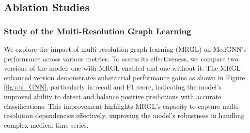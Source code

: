 \vspace{-2mm}
\subsection{Ablation Studies}



\subsubsection{Study of the Multi-Resolution Graph Learning}
We explore the impact of multi-resolution graph learning (MRGL) on MedGNN's performance across various metrics. To assess its effectiveness, we compare two versions of the model: one with MRGL enabled and one without it. 
The MRGL-enhanced version demonstrates substantial performance gains as shown in Figure \ref{fig:abl_GNN}, particularly in recall and F1 score, indicating the model's improved ability to detect and balance positive predictions with accurate classifications. This improvement highlights MRGL's capacity to capture multi-resolution dependencies effectively, improving the model's robustness in handling complex medical time series.



